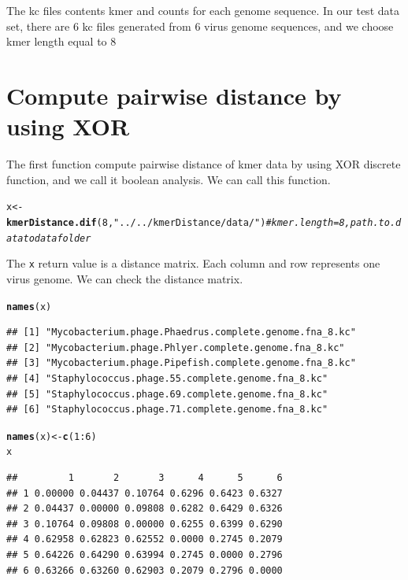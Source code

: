 \documentclass{article}\usepackage[]{graphicx}\usepackage[]{color}
\makeatletter
\newcommand{\hlnum}[1]{\textcolor[rgb]{0.686,0.059,0.569}{#1}}%
\newcommand{\hlstr}[1]{\textcolor[rgb]{0.192,0.494,0.8}{#1}}%
\newcommand{\hlcom}[1]{\textcolor[rgb]{0.678,0.584,0.686}{\textit{#1}}}%
\newcommand{\hlopt}[1]{\textcolor[rgb]{0,0,0}{#1}}%
\newcommand{\hlstd}[1]{\textcolor[rgb]{0.345,0.345,0.345}{#1}}%
\newcommand{\hlkwb}[1]{\textcolor[rgb]{0.69,0.353,0.396}{#1}}%
\newcommand{\hlkwd}[1]{\textcolor[rgb]{0.737,0.353,0.396}{\textbf{#1}}}%
\newenvironment{kframe}{%
 \def\at@end@of@kframe{}%
 \ifinner\ifhmode%
  \def\at@end@of@kframe{\end{minipage}}%
  \begin{minipage}{\columnwidth}%
 \fi\fi%
 \def\FrameCommand##1{\hskip\@totalleftmargin \hskip-\fboxsep
 \colorbox{shadecolor}{##1}\hskip-\fboxsep
     \hskip-\linewidth \hskip-\@totalleftmargin \hskip\columnwidth}%
 \MakeFramed {\advance\hsize-\width
   \@totalleftmargin\z@ \linewidth\hsize
   \@setminipage}}%
 {\par\unskip\endMakeFramed%
 \at@end@of@kframe}
\newenvironment{knitrout}{}{} %
\makeatother
\begin{document}
The kc files contents kmer and counts for each genome sequence. In our test data set, there are 6 kc files generated from 6 virus genome sequences, and we choose kmer length equal to 8

\section{Compute pairwise distance by using XOR}
\label{kmerDistance.dif}

The first function  compute pairwise distance of kmer data by using XOR discrete function, and we call it boolean analysis. We can call this function.

\begin{knitrout}
\color{fgcolor}\begin{kframe}
\begin{alltt}
\hlstd{x} \hlkwb{<-} \hlkwd{kmerDistance.dif}\hlstd{(}\hlnum{8}\hlstd{,}\hlstr{"../../kmerDistance/data/"}\hlstd{)} \hlcom{#kmer.length = 8, path.to.data to data folder}
\end{alltt}
\end{kframe}
\end{knitrout}

The \texttt{x} return value is a distance matrix. Each column and row represents one virus genome. We can check the distance matrix.

\begin{knitrout}
\color{fgcolor}\begin{kframe}
\begin{alltt}
\hlkwd{names}\hlstd{(x)}
\end{alltt}
\begin{verbatim}
## [1] "Mycobacterium.phage.Phaedrus.complete.genome.fna_8.kc"
## [2] "Mycobacterium.phage.Phlyer.complete.genome.fna_8.kc"  
## [3] "Mycobacterium.phage.Pipefish.complete.genome.fna_8.kc"
## [4] "Staphylococcus.phage.55.complete.genome.fna_8.kc"     
## [5] "Staphylococcus.phage.69.complete.genome.fna_8.kc"     
## [6] "Staphylococcus.phage.71.complete.genome.fna_8.kc"
\end{verbatim}
\begin{alltt}
\hlkwd{names}\hlstd{(x)} \hlkwb{<-} \hlkwd{c}\hlstd{(}\hlnum{1}\hlopt{:}\hlnum{6}\hlstd{)}
\hlstd{x}
\end{alltt}
\begin{verbatim}
##         1       2       3      4      5      6
## 1 0.00000 0.04437 0.10764 0.6296 0.6423 0.6327
## 2 0.04437 0.00000 0.09808 0.6282 0.6429 0.6326
## 3 0.10764 0.09808 0.00000 0.6255 0.6399 0.6290
## 4 0.62958 0.62823 0.62552 0.0000 0.2745 0.2079
## 5 0.64226 0.64290 0.63994 0.2745 0.0000 0.2796
## 6 0.63266 0.63260 0.62903 0.2079 0.2796 0.0000
\end{verbatim}
\end{kframe}
\end{knitrout}
\end{document}
